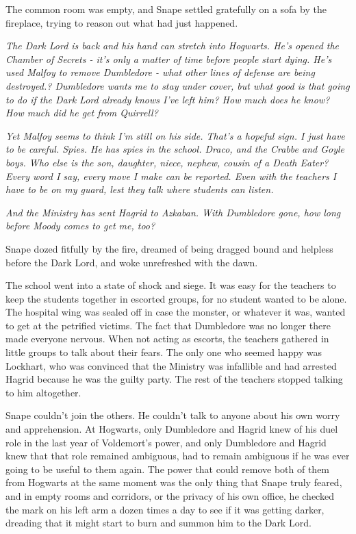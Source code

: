 \documentclass[a4paper,11pt]{article}
\begin{document}
The common room was empty, and Snape settled gratefully on a sofa by the fireplace, trying to reason out what had just happened.

\emph{The Dark Lord is back and his hand can stretch into Hogwarts. He's opened the Chamber of Secrets - it's only a matter of time before people start dying. He's used Malfoy to remove Dumbledore - what other lines of defense are being destroyed.? Dumbledore wants me to stay under cover, but what good is that going to do if the Dark Lord already knows I've left him? How much does he know? How much did he get from Quirrell?}

\emph{Yet Malfoy seems to think I'm still on his side. That's a hopeful sign. I just have to be careful. Spies. He has spies in the school. Draco, and the Crabbe and Goyle boys. Who else is the son, daughter, niece, nephew, cousin of a Death Eater? Every word I say, every move I make can be reported. Even with the teachers I have to be on my guard, lest they talk where students can listen.}

\emph{And the Ministry has sent Hagrid to Azkaban. With Dumbledore gone, how long before Moody comes to get me, too?}

Snape dozed fitfully by the fire, dreamed of being dragged bound and helpless before the Dark Lord, and woke unrefreshed with the dawn.

The school went into a state of shock and siege. It was easy for the teachers to keep the students together in escorted groups, for no student wanted to be alone. The hospital wing was sealed off in case the monster, or whatever it was, wanted to get at the petrified victims. The fact that Dumbledore was no longer there made everyone nervous. When not acting as escorts, the teachers gathered in little groups to talk about their fears. The only one who seemed happy was Lockhart, who was convinced that the Ministry was infallible and had arrested Hagrid because he was the guilty party. The rest of the teachers stopped talking to him altogether.

Snape couldn't join the others. He couldn't talk to anyone about his own worry and apprehension. At Hogwarts, only Dumbledore and Hagrid knew of his duel role in the last year of Voldemort's power, and only Dumbledore and Hagrid knew that that role remained ambiguous, had to remain ambiguous if he was ever going to be useful to them again. The power that could remove both of them from Hogwarts at the same moment was the only thing that Snape truly feared, and in empty rooms and corridors, or the privacy of his own office, he checked the mark on his left arm a dozen times a day to see if it was getting darker, dreading that it might start to burn and summon him to the Dark Lord.
\end{document}
